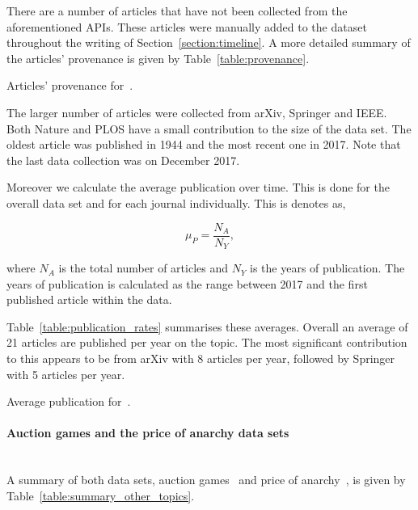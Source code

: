 \documentclass{article}
\theoremstyle{definition}
\newcommand{\manual}{}
\begin{document}
There are a number of \manual articles that have not been collected from the
aforementioned APIs. These articles were manually added to the dataset throughout
the writing of Section~\ref{section:timeline}. A more detailed summary of the 
articles' provenance is given by Table~\ref{table:provenance}.

\begin{table}[!hbtp]
    \begin{center}
    
    \end{center}
    \caption{Articles' provenance for~\cite{}.}
    \label{table:provenance}
\end{table}

The larger number of articles were collected from arXiv, Springer and IEEE. Both
Nature and PLOS have a small contribution to the size of the data set. The oldest
article was published in 1944 and the most recent one in 2017. Note
that the last data collection was on December 2017.

Moreover we calculate the average publication over time. This is done for the overall
data set and for each journal individually. This is denotes as,

\[ \mu_P = \frac{N_A}{N_Y},\]

where \(N_A\) is the total number of articles and \(N_Y\) is the years of publication.
The years of publication is calculated as the range between 2017 and the first published
article within the data.

Table~\ref{table:publication_rates} summarises these averages. Overall an average of
21 articles are published per year on the topic. The most significant contribution
to this appears to be from arXiv with 8 articles per year, followed by Springer
with 5 articles per year.

\begin{table}[!hbtp]
    \begin{center}
    
    \end{center}
    \caption{Average publication for~\cite{}.}
    \label{table:publication_rates}
\end{table}

\paragraph{Auction games and the price of anarchy data sets}
\mbox{ }\\

A summary of both data sets, auction games~\cite{} and price of anarchy~\cite{},
is given by Table~\ref{table:summary_other_topics}.
\end{document}
